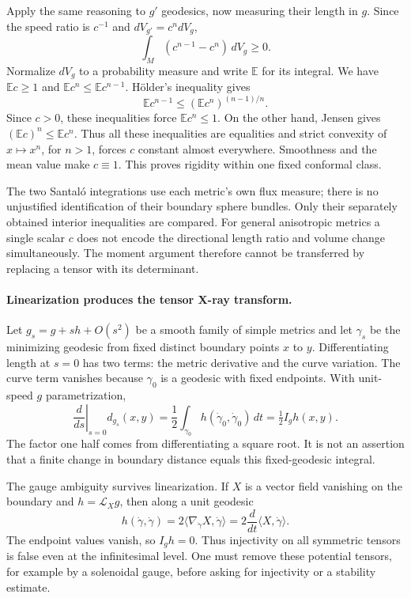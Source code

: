 \documentclass[11pt]{article}
\begin{document}
Apply the same reasoning to $g'$ geodesics, now measuring their length
in $g$. Since the speed ratio is $c^{-1}$ and $dV_{g'}=c^n dV_g$,
\[
                  \int_M(c^{n-1}-c^n)\,dV_g\ge0.
\]
Normalize $dV_g$ to a probability measure and write $\mathbb E$ for
its integral. We have $\mathbb E c\ge1$ and
$\mathbb E c^n\le\mathbb E c^{n-1}$. H\"older's inequality gives
\[
 \mathbb E c^{n-1}\le(\mathbb E c^n)^{(n-1)/n}.
\]
Since $c>0$, these inequalities force $\mathbb E c^n\le1$.
On the other hand, Jensen gives
$(\mathbb E c)^n\le\mathbb E c^n$. Thus all these inequalities
are equalities and strict convexity of $x\mapsto x^n$, for $n>1$,
forces $c$ constant almost everywhere. Smoothness and the mean value
make $c\equiv1$. This proves rigidity within one fixed conformal class.

The two Santal\'o integrations use each metric's own flux measure;
there is no unjustified identification of their boundary sphere bundles.
Only their separately obtained interior inequalities are compared.
For general anisotropic metrics a single scalar $c$ does not encode
the directional length ratio and volume change simultaneously. The
moment argument therefore cannot be transferred by replacing a tensor
with its determinant.

\paragraph{Linearization produces the tensor X-ray transform.}
Let $g_s=g+s h+O(s^2)$ be a smooth family of simple metrics and let
$\gamma_s$ be the minimizing geodesic from fixed distinct boundary
points $x$ to $y$. Differentiating length at $s=0$ has two terms:
the metric derivative and the curve variation. The curve term vanishes
because $\gamma_0$ is a geodesic with fixed endpoints. With unit-speed
$g$ parametrization,
\[
 \left.\frac d{ds}\right|_{s=0}d_{g_s}(x,y)
       =\frac12\int_{\gamma_0}h(\dot\gamma_0,\dot\gamma_0)\,dt
       =\tfrac12 I_g h(x,y).
\]
The factor one half comes from differentiating a square root. It is
not an assertion that a finite change in boundary distance equals
this fixed-geodesic integral.

The gauge ambiguity survives linearization. If $X$ is a vector field
vanishing on the boundary and $h=\mathcal L_Xg$, then along a unit
geodesic
\[
 h(\dot\gamma,\dot\gamma)
      =2\langle\nabla_{\dot\gamma}X,\dot\gamma\rangle
      =2\frac d{dt}\langle X,\dot\gamma\rangle.
\]
The endpoint values vanish, so $I_gh=0$. Thus injectivity on all
symmetric tensors is false even at the infinitesimal level. One must
remove these potential tensors, for example by a solenoidal gauge,
before asking for injectivity or a stability estimate.
\end{document}
